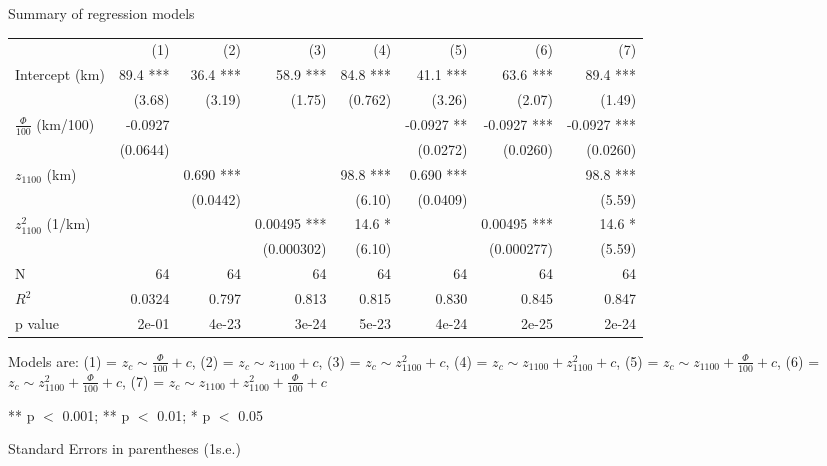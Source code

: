 \documentclass[draft]{agujournal2019}
\begin{document}
\begin{threeparttable}[H]
 \caption{Summary of regression models}
 \label{TableS2}
 \begin{tabularx}{\textwidth}{L{1} R{1} R{1} R{1} R{1} R{1} R{1} R{1}}

  \toprule

                              & (1)      & (2)       & (3)         & (4)      & (5)        & (6)         & (7)         \\

  \cmidrule(r){2-8}

  Intercept (km)              & 89.4 *** & 36.4 ***  & 58.9 ***    & 84.8 *** & 41.1 ***   & 63.6 ***    & 89.4 ***    \\
                              & (3.68)   & (3.19)    & (1.75)      & (0.762)  & (3.26)     & (2.07)      & (1.49)      \\
  $\frac{\Phi}{100}$ (km/100) & -0.0927  &           &             &          & -0.0927 ** & -0.0927 *** & -0.0927 *** \\
                              & (0.0644) &           &             &          & (0.0272)   & (0.0260)    & (0.0260)    \\
  $z_{1100}$ (km)             &          & 0.690 *** &             & 98.8 *** & 0.690 ***  &             & 98.8 ***    \\
                              &          & (0.0442)  &             & (6.10)   & (0.0409)   &             & (5.59)      \\
  $z_{1100}^{2}$ (1/km)       &          &           & 0.00495 *** & 14.6 *   &            & 0.00495 *** & 14.6 *      \\
                              &          &           & (0.000302)  & (6.10)   &            & (0.000277)  & (5.59)      \\

  \cmidrule(r){2-8}

  N                           & 64       & 64        & 64          & 64       & 64         & 64          & 64          \\
  $R^2$                       & 0.0324   & 0.797     & 0.813       & 0.815    & 0.830      & 0.845       & 0.847       \\
  p value                     & 2e-01    & 4e-23     & 3e-24       & 5e-23    & 4e-24      & 2e-25       & 2e-24       \\

  \bottomrule
 \end{tabularx}
 \begin{tablenotes}
  \footnotesize
  \item Models are:
  (1) = $z_{c}\sim\frac{\Phi}{100}+c$,
  (2) = $z_{c}\sim{}z_{1100}+c$,
  (3) = $z_{c}\sim{}z_{1100}^2+c$,
  (4) = $z_{c}\sim{}z_{1100}+z_{1100}^2+c$,
  (5) = $z_{c}\sim{}z_{1100}+\frac{\Phi}{100}+c$,
  (6) = $z_{c}\sim{}z_{1100}^2+\frac{\Phi}{100}+c$,
  (7) = $z_{c}\sim{}z_{1100}+z_{1100}^2+\frac{\Phi}{100}+c$
  \item *** p $<$ 0.001;  ** p $<$ 0.01;  * p $<$ 0.05
  \item Standard Errors in parentheses  (1s.e.)
 \end{tablenotes}
\end{threeparttable}
\end{document}
